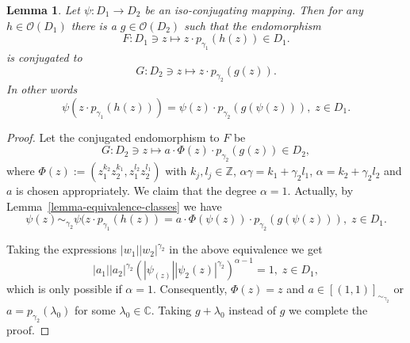 \documentclass[a4paper,12pt]{amsart}
\newtheorem{lemma}[theorem]{Lemma}
\theoremstyle{definition}
\begin{document}
\begin{lemma} Let $\psi \colon D_1\to D_2$ be an iso-conjugating mapping. Then
for any $h\in\mathcal O(D_1)$ there is a $g\in\mathcal O(D_2)$ such that
the endomorphism
\begin{equation}
  F \colon D_1\owns z \mapsto z\cdot p_{\gamma_1}(h(z))\in D_1.    
\end{equation}
is conjugated to
\begin{equation}
    G \colon D_2\owns z \mapsto z\cdot p_{\gamma_2}(g(z)).
\end{equation}
In other words
\begin{equation}
    \psi(z\cdot p_{\gamma_1}(h(z)))=\psi(z)\cdot p_{\gamma_2}(g(\psi(z))), \; z\in D_1.
\end{equation}
\end{lemma}
\begin{proof}
    Let the conjugated endomorphism to $F$ be
\begin{equation}
    G \colon D_2\owns z \mapsto a\cdot \Phi(z)\cdot p_{\gamma_2}(g(z))\in D_2,
\end{equation}
where $\Phi(z):=(z_1^{k_2}z_2^{k_1},z_1^{l_2}z_2^{l_1})$ with $k_j,l_j\in\mathbb Z$, $\alpha\gamma=k_1+\gamma_2 l_1$, $\alpha=k_2+\gamma_2 l_2$ and $a$ is chosen appropriately. We claim that the degree $\alpha=1$. Actually, by Lemma~\ref{lemma-equivalence-classes} we have
\begin{equation}
  \psi(z)\sim_{\gamma_2}\psi(z\cdot p_{\gamma_1}(h(z))=a\cdot \Phi(\psi(z))\cdot p_{\gamma_2}(g(\psi(z))),\; z\in D_1.  
\end{equation}

Taking the expressions $|w_1||w_2|^{\gamma_2}$ in the above equivalence we get
\begin{equation}
    |a_1||a_2|^{\gamma_2}(|\psi_(z)||\psi_2(z)|^{\gamma_2})^{\alpha-1}=1,\; z\in D_1,
\end{equation}
which is only possible if $\alpha=1$. Consequently, $\Phi(z)=z$ and $a\in[(1,1)]_{\sim_{\gamma_2}}$ or $a=p_{\gamma_2}(\lambda_0)$ for some $\lambda_0\in\mathbb C$. Taking $g+\lambda_0$ instead of $g$ we complete the proof.
\end{proof}
\end{document}
